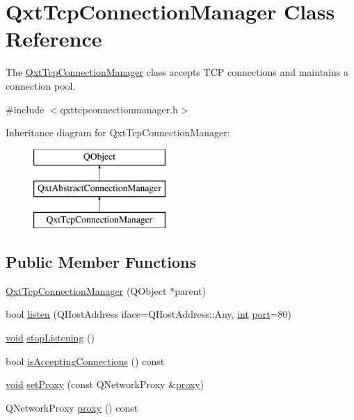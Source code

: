 \hypertarget{class_qxt_tcp_connection_manager}{\section{Qxt\-Tcp\-Connection\-Manager Class Reference}
\label{class_qxt_tcp_connection_manager}
}


The \hyperlink{class_qxt_tcp_connection_manager}{Qxt\-Tcp\-Connection\-Manager} class accepts T\-C\-P connections and maintains a connection pool.  




{\ttfamily \#include $<$qxttcpconnectionmanager.\-h$>$}

Inheritance diagram for Qxt\-Tcp\-Connection\-Manager\-:\begin{figure}[H]
\begin{center}
\leavevmode
\includegraphics[height=3.000000cm]{class_qxt_tcp_connection_manager}
\end{center}
\end{figure}
\subsection*{Public Member Functions}
\begin{DoxyCompactItemize}
\item 
\hyperlink{class_qxt_tcp_connection_manager_aabe701bb16057da03f2e070299225995}{Qxt\-Tcp\-Connection\-Manager} (Q\-Object $\ast$parent)
\item 
bool \hyperlink{class_qxt_tcp_connection_manager_a3ffb3c21084c7f690d6a39f340663129}{listen} (Q\-Host\-Address iface=Q\-Host\-Address\-::\-Any, \hyperlink{ioapi_8h_a787fa3cf048117ba7123753c1e74fcd6}{int} \hyperlink{classport}{port}=80)
\item 
\hyperlink{group___u_a_v_objects_plugin_ga444cf2ff3f0ecbe028adce838d373f5c}{void} \hyperlink{class_qxt_tcp_connection_manager_a2d30ce42c06cd0031602bcbf9822a78b}{stop\-Listening} ()
\item 
bool \hyperlink{class_qxt_tcp_connection_manager_a950c27afebf8044574b6ccbfd564958d}{is\-Accepting\-Connections} () const 
\item 
\hyperlink{group___u_a_v_objects_plugin_ga444cf2ff3f0ecbe028adce838d373f5c}{void} \hyperlink{class_qxt_tcp_connection_manager_acc70bd503b8830c173cc05216af71497}{set\-Proxy} (const Q\-Network\-Proxy \&\hyperlink{class_qxt_tcp_connection_manager_a95e4aa212c2f8512d99478eb6002d48d}{proxy})
\item 
Q\-Network\-Proxy \hyperlink{class_qxt_tcp_connection_manager_a95e4aa212c2f8512d99478eb6002d48d}{proxy} () const 
\end{DoxyCompactItemize}
